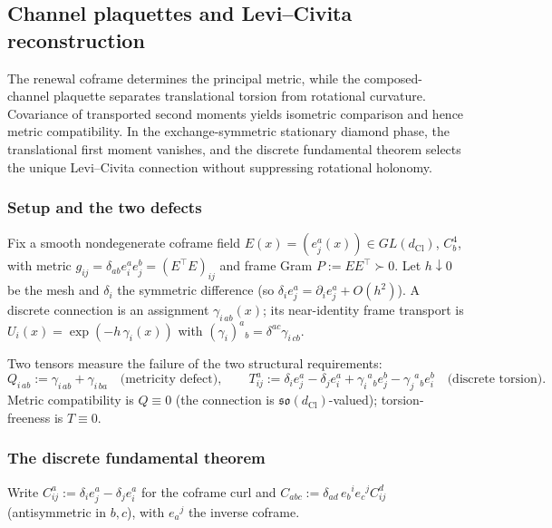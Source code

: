 \documentclass[11pt]{article}
\theoremstyle{definition}
\theoremstyle{remark}
\newcommand{\dCl}{d_{\mathrm{Cl}}}
\newcommand{\so}{\mathfrak{so}}
\begin{document}




\subsection{Channel plaquettes and Levi--Civita reconstruction}
\label{sec:cix}
\label{sec:cxii}

The renewal coframe determines the principal metric, while the composed-channel
plaquette separates translational torsion from rotational curvature.  Covariance
of transported second moments yields isometric comparison and hence metric
compatibility.  In the exchange-symmetric stationary diamond phase, the
translational first moment vanishes, and the discrete fundamental theorem
selects the unique Levi--Civita connection without suppressing rotational
holonomy.

\subsubsection{Setup and the two defects}

Fix a smooth nondegenerate coframe field $E(x)=(e^a_j(x))\in GL(\dCl)$, $C^4_b$,
with metric $g_{ij}=\delta_{ab}e^a_ie^b_j=(E^\top E)_{ij}$ and frame Gram
$P:=EE^\top\succ0$.  Let $h\downarrow0$ be the mesh and $\delta_i$ the symmetric
difference (so $\delta_i e^a_j=\partial_i e^a_j+O(h^2)$).  A discrete connection is
an assignment $\gamma_{i\,ab}(x)$; its near-identity frame transport is
$U_i(x)=\exp(-h\,\gamma_i(x))$ with $(\gamma_i)^a{}_b=\delta^{ac}\gamma_{i\,cb}$.

Two tensors measure the failure of the two structural requirements:
\[
  Q_{i\,ab}:=\gamma_{i\,ab}+\gamma_{i\,ba}
  \quad\text{(metricity defect)},
  \qquad
  T^a_{ij}:=\delta_i e^a_j-\delta_j e^a_i
            +\gamma_i{}^a{}_b e^b_j-\gamma_j{}^a{}_b e^b_i
  \quad\text{(discrete torsion)}.
\]
Metric compatibility is $Q\equiv0$ (the connection is $\so(\dCl)$-valued);
torsion-freeness is $T\equiv0$.

\subsubsection{The discrete fundamental theorem}

Write $C^a_{ij}:=\delta_i e^a_j-\delta_j e^a_i$ for the coframe curl and
$C_{abc}:=\delta_{ad}\,e_b{}^i e_c{}^j C^d_{ij}$ (antisymmetric in $b,c$), with
$e_a{}^j$ the inverse coframe.
\end{document}
